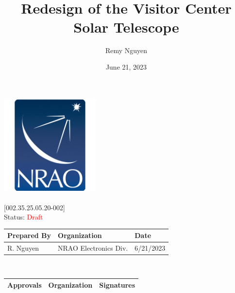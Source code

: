 \documentclass[titlepage]{article}
\title{Redesign of the Visitor Center Solar Telescope}
\author{Remy Nguyen
    }%
\date{June 21, 2023}
\def\docnum{[002.35.25.05.20-002]}
\def\status{\textcolor{red}{Draft}}
\renewcommand{\arraystretch}{1.4}
\begin{document}
\setlength{\leftmargin}{1in}        %
\setlength{\rightmargin}{1in}       %
\setlength{\voffset}{-1.2in}        %
\setlength{\headheight}{3.5cm}      %
\setlength{\textheight}{591pt}      %
\setlength{\footskip}{60pt}         %

\begin{titlepage}
\thispagestyle{fancy}
\begin{center}
     \includegraphics[width=5cm]{images/NRAO Logo Badge.png} \\
     \vspace*{0.5cm}
     \textbf{\Huge\thetitle} \\
     \vspace*{0.5cm}
     \large\docnum \\
     \huge Status: \status \\
     \vspace*{1cm} \large
     \begin{tabular}{|m{6.93cm}|m{4.5cm}|m{2cm}|} \hline
        \rowcolor{nraoblue}
        \textbf{Prepared By} & \textbf{Organization} & \textbf{Date} \\ \hline
        R. Nguyen & NRAO Electronics Div. & 6/21/2023 \\ 
        \hline
    \end{tabular} \\
    \vspace*{1cm}
    \begin{tabular}{|m{3cm}|m{3.5cm}|m{6.93cm}|} \hline
        \rowcolor{nraoblue}
        \textbf{Approvals} & \textbf{Organization} & \textbf{Signatures} \\ \hline
    \end{tabular}
    \renewcommand{\arraystretch}{1.5}
    \begin{tabular}{|m{3cm}|m{3.5cm}|m{6.93cm}|}

\end{tabular}
\end{center}
\end{titlepage}
\end{document}
